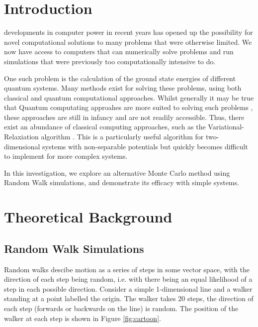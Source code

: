 \documentclass[journal]{IEEEtran}
\begin{document}
\section{Introduction}
 developments in computer power in recent years has opened
up the possibility for novel computational solutions to many problems that were
otherwise limited. We now have access to computers that can numerically solve
problems and run simulations that were previously too computationally intensive
to do.

One such problem is the calculation of the ground state energies of different
quantum systems. Many methods exist for solving these problems, using both
classical and quantum computational approaches. Whilst generally it may be true
that Quantum computating approahes are more suited to solving such problems
\cite{Mazzola}, these approaches are still in infancy and are not readily
accessible. Thus, there exist an abundance of classical computing approaches,
such as the Variational-Relaxiation algorithm \cite{Schroeder2017}. This is a
particularly useful algorithm for two-dimensional systems with non-separable
potentials but quickly becomes difficult to implement for more complex systems.

In this investigation, we explore an alternative Monte Carlo method using Random
Walk simulations, and demonstrate its efficacy with simple systems.

\section{Theoretical Background}
\label{sec:TheoreticalBackground}

\subsection{Random Walk Simulations}

Random walks descibe motion as a series of steps in some vector space, with the
direction of each step being random, i.e. with there being an equal likelihood
of a step in each possible direction. Consider a simple 1-dimensional line and a
walker standing at a point labelled the origin. The walker takes 20 steps, the
direction of each step (forwards or backwards on the line) is random. The
position of the walker at each step is shown in Figure \ref{fig:cartoon}.
\end{document}
